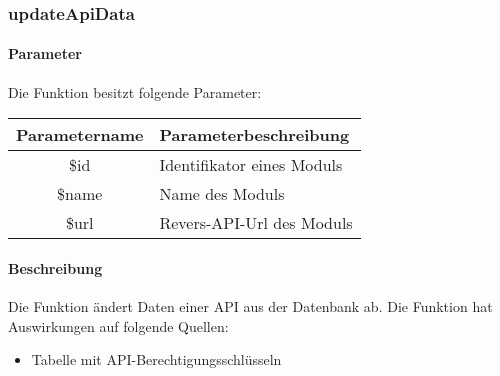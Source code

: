 \subsubsection{updateApiData}
\paragraph{Parameter} Die Funktion besitzt folgende Parameter:
\begin{table}[H]
	\begin{tabular}{|c|p{11cm}|}
		\hline
		\textbf{Parametername} & \textbf{Parameterbeschreibung} \\ \hline
		\$id   & Identifikator eines Moduls \\ \hline
		\$name & Name des Moduls \\ \hline
		\$url  & Revers-API-Url des Moduls \\ \hline
	\end{tabular}
\end{table}
\paragraph{Beschreibung} Die Funktion ändert Daten einer API aus der Datenbank ab. Die Funktion hat Auswirkungen auf folgende Quellen:
\begin{itemize}
	\item Tabelle mit API-Berechtigungsschlüsseln
\end{itemize}